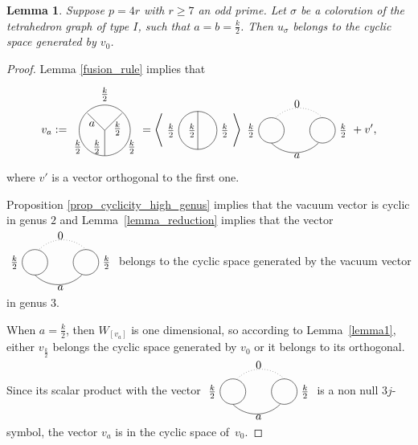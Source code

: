 \documentclass[pdftex]{sigma}
\numberwithin{equation}{section}
\newtheorem{Lemma}[Theorem]{Lemma}
\begin{document}
\begin{Lemma} Suppose $p=4r$ with $r\geq 7$ an odd prime. Let $\sigma$ be a coloration of the tetrahedron graph of type $I$, such that $a=b= \frac{k}{2}$. Then $u_{\sigma}$ belongs to the cyclic space generated by $v_0$.
\end{Lemma}


\begin{proof}Lemma \ref{fusion_rule} implies that{\samepage
\begin{gather*} v_a:=\Tetahedrongraph{$\frac{k}{2}$}{$a$}{$\frac{k}{2}$}{$\frac{k}{2}$}{$\frac{k}{2}$}{$\frac{k}{2}$} = \left< \thetagraph{$\frac{k}{2}$}{$\frac{k}{2}$}{$\frac{k}{2}$} \right>
\tikz[scale=0.4,baseline=-0.5ex]{
\draw (-2,0) circle (1);
\draw (2,0) circle (1);
\draw (-2,-1) arc (-135: -45: 2.6);
\draw (2,1) [dotted] arc ( 45:135: 2.6);
\draw (0, 1.5) node[above]{$0$};
\draw (0, -1.5) node[below]{$a$};
\draw (-3, 0) node[left]{$\frac{k}{2}$};
\draw (3, 0) node[right]{$\frac{k}{2}$};
} + v',\end{gather*}
 where $v'$ is a vector orthogonal to the first one.}

Proposition \ref{prop_cyclicity_high_genus} implies that the vacuum vector is cyclic in genus $2$ and Lemma~\ref{lemma_reduction} implies that the vector $
\tikz[scale=0.4,baseline=-0.5ex]{
\draw (-2,0) circle (1);
\draw (2,0) circle (1);
\draw (-2,-1) arc (-135: -45: 2.6);
\draw (2,1) [dotted] arc ( 45:135: 2.6);
\draw (0, 1.5) node[above]{$0$};
\draw (0, -1.5) node[below]{$a$};
\draw (-3, 0) node[left]{$\frac{k}{2}$};
\draw (3, 0) node[right]{$\frac{k}{2}$};
}$
belongs to the cyclic space generated by the vacuum vector in genus $3$.

When $a=\frac{k}{2}$, then $W_{[v_a]}$ is one dimensional, so according to Lemma~\ref{lemma1}, either $v_{\frac{k}{2}}$ belongs the cyclic space generated by $v_0$ or it belongs to its orthogonal. Since its scalar product with the vector
$
\tikz[scale=0.4,baseline=-0.5ex]{
\draw (-2,0) circle (1);
\draw (2,0) circle (1);
\draw (-2,-1) arc (-135: -45: 2.6);
\draw (2,1) [dotted] arc ( 45:135: 2.6);
\draw (0, 1.5) node[above]{$0$};
\draw (0, -1.5) node[below]{$a$};
\draw (-3, 0) node[left]{$\frac{k}{2}$};
\draw (3, 0) node[right]{$\frac{k}{2}$};
}$
is a non null $3j$-symbol, the vector $v_a$ is in the cyclic space of~$v_0$.


\end{proof}
\end{document}
